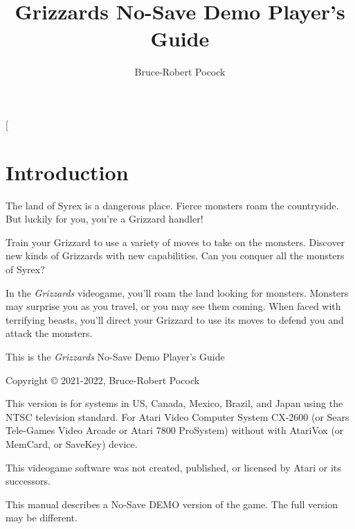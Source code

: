 \documentclass[10pt,twocolumn,openany,article]{memoir}
\title{Grizzards \ifdefined\NOSAVE No-Save \fi\ifdefined\DEMO Demo \fi Player's Guide}
\author{Bruce-Robert Pocock}
\newcommand\TV{NTSC}
\newcommand\REGION{US, Canada, Mexico, Brazil, and Japan}
\newcommand\TV{PAL}
\newcommand\REGION{UK and Europe (except France)}
\newcommand\TV{SECAM}
\newcommand\REGION{France, Russia, Africa}
\begin{document}
\frontmatter




\thispagestyle{empty}

\twocolumn[

\chapter*{Introduction}\label{Introduction}

The  land of  Syrex  is  a dangerous  place.  Fierce  monsters roam  the
countryside. But luckily for you, you're a Grizzard handler!

Train your Grizzard to  use a variety of moves to  take on the monsters.
Discover new kinds  of Grizzards with new capabilities.  Can you conquer
all the monsters of Syrex?

\bigskip

In the \textit{Grizzards}  videogame, you'll roam the land  looking for monsters.
Monsters may  surprise you as  you travel, or  you may see  them coming.
When faced  with terrifying beasts,  you'll direct your Grizzard  to use
its moves to defend you and attack the monsters.

\vspace{2in}\vfill

This is the \textit{Grizzards} \ifdefined\NOSAVE No-Save \fi\ifdefined\DEMO Demo \fi Player's Guide

Copyright \copyright{} 2021-2022, Bruce-Robert Pocock

\bigskip

This  version is  for systems  in \REGION{}  using the  \TV{} television
standard. For Atari  Video Computer System CX-2600  (or Sears Tele-Games
Video Arcade  or Atari  7800 ProSystem) \ifdefined\NOSAVE  without \else
with \fi AtariVox (or MemCard, or SaveKey) device.

\bigskip

This videogame software was not created, published, or licensed by Atari
or its successors.

\ifdefined\DEMO
\bigskip

This manual describes a \ifdefined\NOSAVE No-Save \fi DEMO version of the game. The full version may
be different.
\fi
\end{document}
